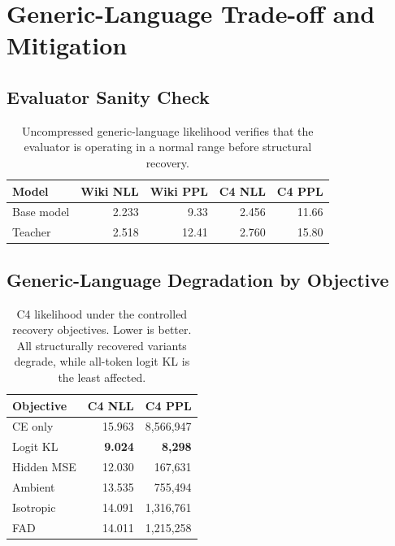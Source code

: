 \documentclass{article}
\theoremstyle{plain}
\theoremstyle{definition}
\theoremstyle{remark}
\begin{document}
\section{Generic-Language Trade-off and Mitigation}
\label{app:generic-lm}

\subsection{Evaluator Sanity Check}

\begin{table}[H]
\caption{Uncompressed generic-language likelihood verifies that the evaluator is
operating in a normal range before structural recovery.}
\label{tab:app-generic-sanity}
\centering
\small
\setlength{\tabcolsep}{9pt}
\begin{tabular}{@{}lrrrr@{}}
\toprule
\textbf{Model} & \textbf{Wiki NLL} & \textbf{Wiki PPL}
& \textbf{C4 NLL} & \textbf{C4 PPL}\\
\midrule
Base model & 2.233 & 9.33 & 2.456 & 11.66\\
Teacher & 2.518 & 12.41 & 2.760 & 15.80\\
\bottomrule
\end{tabular}
\end{table}

\subsection{Generic-Language Degradation by Objective}

\begin{table}[H]
\caption{C4 likelihood under the controlled recovery objectives.  Lower is
better.  All structurally recovered variants degrade, while all-token logit KL is
the least affected.}
\label{tab:app-c4-objectives}
\centering
\small
\setlength{\tabcolsep}{10pt}
\begin{tabular}{@{}lrr@{}}
\toprule
\textbf{Objective} & \textbf{C4 NLL} & \textbf{C4 PPL}\\
\midrule
CE only & 15.963 & 8,566,947\\
Logit KL & \textbf{9.024} & \textbf{8,298}\\
Hidden MSE & 12.030 & 167,631\\
Ambient & 13.535 & 755,494\\
Isotropic & 14.091 & 1,316,761\\
FAD & 14.011 & 1,215,258\\
\bottomrule
\end{tabular}
\end{table}
\end{document}
